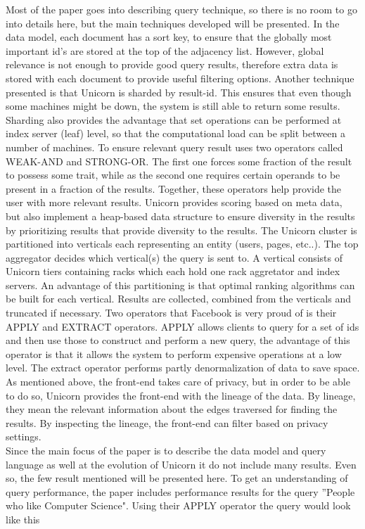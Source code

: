 \documentclass{article}
\begin{document}
\noindent Most of the paper goes into describing query technique, so there is no room to go into details here, but the main techniques developed will be presented. In the data model, each document has a sort key, to ensure that the globally most important id's are stored at the top of the adjacency list. However, global relevance is not enough to provide good query results, therefore extra data is stored with each document to provide useful filtering options. 
Another technique presented is that Unicorn is sharded by result-id. This ensures that even though some machines might be down, the system is still able to return some results. Sharding also provides the advantage that set operations can be performed at index server (leaf) level, so that the computational load can be split between a number of machines. 
To ensure relevant query result uses two operators called WEAK-AND and STRONG-OR. The first one forces some fraction of the result to possess some trait, while as the second one requires certain operands to be present in a fraction of the results. Together, these operators help provide the user with more relevant results. 
Unicorn provides scoring based on meta data, but also implement a heap-based data structure to ensure diversity in the results by prioritizing results that provide diversity to the results. 
The Unicorn cluster is partitioned into verticals each representing an entity (users, pages, etc..). The top aggregator decides which vertical(s) the query is sent to. A vertical consists of Unicorn tiers containing racks which each hold one rack aggretator and index servers. An advantage of this partitioning is that optimal ranking algorithms can be built for each vertical. Results are collected, combined from the verticals and truncated if necessary. 
Two operators that Facebook is very proud of is their APPLY and EXTRACT operators. APPLY allows clients to query for a set of ids and then use those to construct and perform a new query, the advantage of this operator is that it allows the system to perform expensive operations at a low level. The extract operator performs partly denormalization of data to save space.
As mentioned above, the front-end takes care of privacy, but in order to be able to do so, Unicorn provides the front-end with the lineage of the data. By lineage, they mean the relevant information about the edges traversed for finding the results. By inspecting the lineage, the front-end can filter based on privacy settings.\\

\noindent Since the main focus of the paper is to describe the data model and query language as well at the evolution of Unicorn it do not include many results. Even so, the few result mentioned will be presented here. To get an understanding of query performance, the paper includes performance results for the query ''People who like Computer Science". Using their APPLY operator the query would look like this\\
\end{document}
